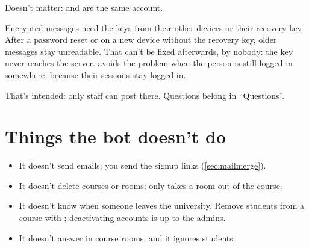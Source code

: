 \begin{description}[style=nextline,leftmargin=1.5em,font=\normalfont\bfseries]
    Doesn't matter:  and  are the same account.
  \item[\enquote{I can't read older messages.}]
    Encrypted messages need the keys from their other devices or their recovery key. After
    a password reset or on a new device without the recovery key, older messages stay
    unreadable. That can't be fixed afterwards, by nobody: the key never reaches the server.
     avoids the problem when the person is still logged in somewhere, because
    their sessions stay logged in.
  \item[\enquote{I can't write in Announcements.}]
    That's intended: only staff can post there. Questions belong in \enquote{Questions}.
\end{description}

\section{Things the bot doesn't do}

\begin{itemize}
  \item It doesn't send emails; you send the signup links (\autoref{sec:mailmerge}).
  \item It doesn't delete courses or rooms;  only takes a room out of the
        course.
  \item It doesn't know when someone leaves the university. Remove students from a course
        with ; deactivating accounts is up to the admins.
  \item It doesn't answer in course rooms, and it ignores students.
\end{itemize}
